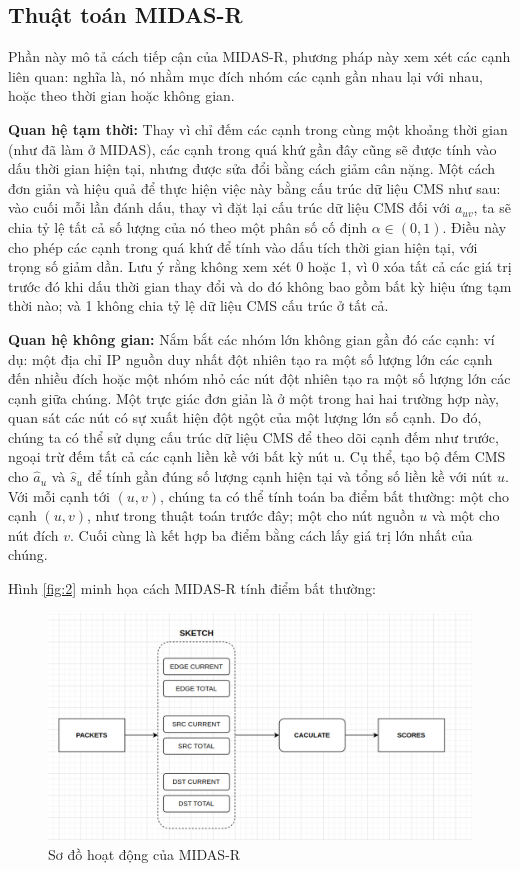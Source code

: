\subsection{Thuật toán MIDAS-R}

Phần này mô tả cách tiếp cận của MIDAS-R\cite{midasr}, phương pháp này xem
xét các cạnh liên quan: nghĩa là, nó nhằm mục đích nhóm các cạnh gần nhau lại với nhau, hoặc
theo thời gian hoặc không gian.


\textbf{Quan hệ tạm thời:} Thay vì chỉ đếm các cạnh trong cùng một khoảng thời gian
(như đã làm ở MIDAS), các cạnh trong
quá khứ gần đây cũng sẽ được tính vào dấu thời gian hiện tại, nhưng được sửa đổi bằng cách giảm
cân nặng. Một cách đơn giản và hiệu quả để thực hiện việc này bằng cấu trúc dữ liệu CMS
như sau: vào cuối mỗi lần đánh dấu, thay vì đặt lại cấu trúc dữ liệu CMS
đối với $a_{uv}$, ta sẽ chia tỷ lệ tất cả số lượng của nó theo một phân số cố định $\alpha \in (0, 1)$. Điều này cho phép các cạnh trong quá khứ
để tính vào dấu tích thời gian hiện tại, với trọng số giảm dần. Lưu ý rằng
không xem xét 0 hoặc 1, vì 0 xóa tất cả các giá trị trước đó khi dấu thời gian thay đổi
và do đó không bao gồm bất kỳ hiệu ứng tạm thời nào; và 1 không chia tỷ lệ dữ liệu CMS
cấu trúc ở tất cả.

\textbf{Quan hệ không gian:} Nắm bắt các nhóm lớn không gian gần đó
các cạnh: ví dụ: một địa chỉ IP nguồn duy nhất đột nhiên tạo ra một số lượng lớn các cạnh
đến nhiều đích hoặc một nhóm nhỏ các nút đột nhiên tạo ra một
số lượng lớn các cạnh giữa chúng. Một trực giác đơn giản là ở một trong hai
hai trường hợp này, quan sát các nút có sự xuất hiện đột ngột của một lượng lớn
số cạnh. Do đó, chúng ta có thể sử dụng cấu trúc dữ liệu CMS để theo dõi cạnh
đếm như trước, ngoại trừ đếm tất cả các cạnh liền kề với bất kỳ nút u. Cụ thể,
tạo bộ đếm CMS cho $\hat{a}_u$ và $\hat{s}_u$ để tính gần đúng số lượng cạnh hiện tại và tổng số
liền kề với nút $u$. Với mỗi cạnh tới $(u,v)$, chúng ta có thể tính toán ba
điểm bất thường: một cho cạnh $(u,v)$, như trong thuật toán trước đây; một cho nút nguồn
$u$ và một cho nút đích $v$. Cuối cùng là kết hợp ba điểm bằng cách
lấy giá trị lớn nhất của chúng.


Hình \ref{fig:2} minh họa cách MIDAS-R tính điểm bất thường:

\begin{figure}[H]
    \centering
    \includegraphics[width=1.0\textwidth]{figures/midasr.png}
    \caption{Sơ đồ hoạt động của MIDAS-R}
    \label{fig:4}
\end{figure}

